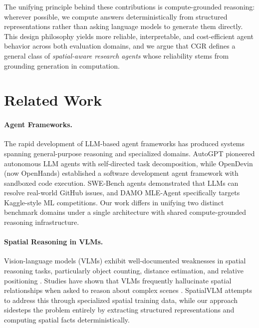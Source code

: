 \documentclass[11pt]{article}
\begin{document}
The unifying principle behind these contributions is compute-grounded reasoning: wherever possible, we compute answers deterministically from structured representations rather than asking language models to generate them directly. This design philosophy yields more reliable, interpretable, and cost-efficient agent behavior across both evaluation domains, and we argue that CGR defines a general class of \emph{spatial-aware research agents} whose reliability stems from grounding generation in computation.

\section{Related Work}
\label{sec:related}

\paragraph{Agent Frameworks.}
The rapid development of LLM-based agent frameworks has produced systems spanning general-purpose reasoning and specialized domains. AutoGPT \citep{autogpt2023} pioneered autonomous LLM agents with self-directed task decomposition, while OpenDevin (now OpenHands) \citep{hong2024opendevin} established a software development agent framework with sandboxed code execution. SWE-Bench agents \citep{jimenez2024swebench} demonstrated that LLMs can resolve real-world GitHub issues, and DAMO MLE-Agent \citep{zhang2024mleagent} specifically targets Kaggle-style ML competitions. Our work differs in unifying two distinct benchmark domains under a single architecture with shared compute-grounded reasoning infrastructure.

\paragraph{Spatial Reasoning in VLMs.}
Vision-language models (VLMs) exhibit well-documented weaknesses in spatial reasoning tasks, particularly object counting, distance estimation, and relative positioning \citep{liu2024llava, chen2024spatialvlm}. Studies have shown that VLMs frequently hallucinate spatial relationships when asked to reason about complex scenes \citep{li2023evaluating}. SpatialVLM \citep{chen2024spatialvlm} attempts to address this through specialized spatial training data, while our approach sidesteps the problem entirely by extracting structured representations and computing spatial facts deterministically.
\end{document}
